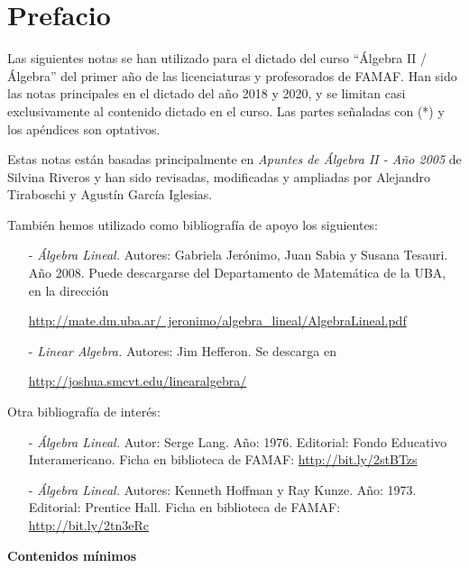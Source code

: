 \documentclass[a4paper,12pt,twoside,spanish,reqno]{amsbook}
\theoremstyle{definition}
\theoremstyle{remark}
\begin{document}
	\tableofcontents 
	
	
	\chapter*{Prefacio} 

	
	Las siguientes notas se han utilizado para el dictado del curso ``Álgebra II / Álgebra'' del primer año de las licenciaturas y profesorados de FAMAF. 	Han sido las notas principales en el dictado del año 2018 y 2020, y se limitan casi exclusivamente al contenido dictado en el curso. Las partes señaladas con (*) y los apéndices son optativos.
	
	Estas notas están basadas principalmente en \textit{Apuntes de Álgebra II - Año 2005} de Silvina Riveros y han sido revisadas, modificadas y ampliadas por Alejandro Tiraboschi  y Agustín García Iglesias. 
	
	También hemos utilizado como bibliografía de apoyo  los siguientes: 
	
	\begin{enumerate}
		\item [-] \textit{Álgebra Lineal.} Autores: Gabriela Jerónimo, Juan Sabia y Susana Tesauri. Año 2008. Puede descargarse del Departamento de Matemática de la UBA, en la dirección
		
		\href{http://mate.dm.uba.ar/~jeronimo/algebra_lineal/AlgebraLineal.pdf}	 {http://mate.dm.uba.ar/~jeronimo/algebra\_lineal/AlgebraLineal.pdf}
		\item [- ] \textit{Linear Algebra.} Autores: Jim Hefferon. Se descarga en
		
		\href{http://joshua.smcvt.edu/linearalgebra/}{http://joshua.smcvt.edu/linearalgebra/}
	\end{enumerate}
	
	
	Otra bibliografía de interés:
		\begin{enumerate}
			\item [-] \textit{Álgebra Lineal.}  Autor: Serge Lang. Año: 1976. Editorial: Fondo Educativo Interamericano. Ficha en biblioteca de FAMAF: \href{http://bit.ly/2stBTzs}{http://bit.ly/2stBTzs}
			\item [-] \textit{Álgebra Lineal.} Autores: Kenneth Hoffman y Ray Kunze.  Año: 1973. Editorial: Prentice Hall. Ficha en biblioteca de FAMAF:  \href{http://bit.ly/2tn3eRc}{http://bit.ly/2tn3eRc}
		\end{enumerate}
	
	
	\newpage
	\begin{center}
		\textbf{\large Contenidos mínimos}
	\end{center}
	
\end{document}
